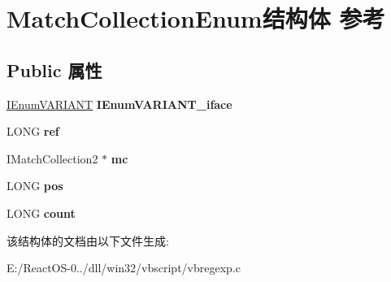 \hypertarget{struct_match_collection_enum}{}\section{Match\+Collection\+Enum结构体 参考}
\label{struct_match_collection_enum}
\subsection*{Public 属性}
\begin{DoxyCompactItemize}
\item 
\mbox{\label{struct_match_collection_enum_a13b6aad1a18e46d906cf3ec06b6815aa}} 
\hyperlink{interface_i_enum_v_a_r_i_a_n_t}{I\+Enum\+V\+A\+R\+I\+A\+NT} {\bfseries I\+Enum\+V\+A\+R\+I\+A\+N\+T\+\_\+iface}
\item 
\mbox{\label{struct_match_collection_enum_af501a74a6d783c1342f859998b04ad87}} 
L\+O\+NG {\bfseries ref}
\item 
\mbox{\label{struct_match_collection_enum_a89eb42edee25767750a6a09ae27686e8}} 
I\+Match\+Collection2 $\ast$ {\bfseries mc}
\item 
\mbox{\label{struct_match_collection_enum_afebc4b64b426fdb3d14ef967d250b5f8}} 
L\+O\+NG {\bfseries pos}
\item 
\mbox{\label{struct_match_collection_enum_a8c7eb55ad5da8768d31ccc63d30b7d5c}} 
L\+O\+NG {\bfseries count}
\end{DoxyCompactItemize}


该结构体的文档由以下文件生成\+:\begin{DoxyCompactItemize}
\item 
E\+:/\+React\+O\+S-\/0../dll/win32/vbscript/vbregexp.\+c\end{DoxyCompactItemize}
